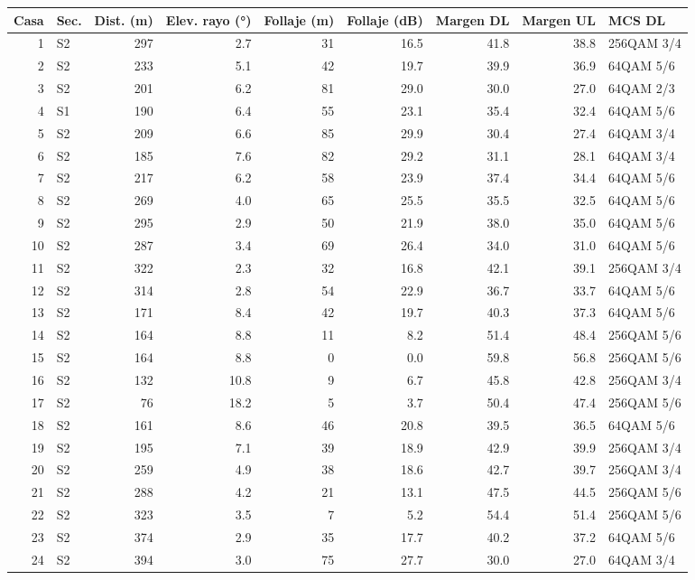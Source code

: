 \begin{longtable}{rlrrrrrrl}\toprule Casa & Sec. & Dist. (m) & Elev. rayo (°) & Follaje (m) & Follaje (dB) & Margen DL & Margen UL & MCS DL\\\midrule\endhead
1 & S2 & 297 & 2.7 & 31 & 16.5 & 41.8 & 38.8 & 256QAM 3/4\\
2 & S2 & 233 & 5.1 & 42 & 19.7 & 39.9 & 36.9 & 64QAM 5/6\\
3 & S2 & 201 & 6.2 & 81 & 29.0 & 30.0 & 27.0 & 64QAM 2/3\\
4 & S1 & 190 & 6.4 & 55 & 23.1 & 35.4 & 32.4 & 64QAM 5/6\\
5 & S2 & 209 & 6.6 & 85 & 29.9 & 30.4 & 27.4 & 64QAM 3/4\\
6 & S2 & 185 & 7.6 & 82 & 29.2 & 31.1 & 28.1 & 64QAM 3/4\\
7 & S2 & 217 & 6.2 & 58 & 23.9 & 37.4 & 34.4 & 64QAM 5/6\\
8 & S2 & 269 & 4.0 & 65 & 25.5 & 35.5 & 32.5 & 64QAM 5/6\\
9 & S2 & 295 & 2.9 & 50 & 21.9 & 38.0 & 35.0 & 64QAM 5/6\\
10 & S2 & 287 & 3.4 & 69 & 26.4 & 34.0 & 31.0 & 64QAM 5/6\\
11 & S2 & 322 & 2.3 & 32 & 16.8 & 42.1 & 39.1 & 256QAM 3/4\\
12 & S2 & 314 & 2.8 & 54 & 22.9 & 36.7 & 33.7 & 64QAM 5/6\\
13 & S2 & 171 & 8.4 & 42 & 19.7 & 40.3 & 37.3 & 64QAM 5/6\\
14 & S2 & 164 & 8.8 & 11 & 8.2 & 51.4 & 48.4 & 256QAM 5/6\\
15 & S2 & 164 & 8.8 & 0 & 0.0 & 59.8 & 56.8 & 256QAM 5/6\\
16 & S2 & 132 & 10.8 & 9 & 6.7 & 45.8 & 42.8 & 256QAM 3/4\\
17 & S2 & 76 & 18.2 & 5 & 3.7 & 50.4 & 47.4 & 256QAM 5/6\\
18 & S2 & 161 & 8.6 & 46 & 20.8 & 39.5 & 36.5 & 64QAM 5/6\\
19 & S2 & 195 & 7.1 & 39 & 18.9 & 42.9 & 39.9 & 256QAM 3/4\\
20 & S2 & 259 & 4.9 & 38 & 18.6 & 42.7 & 39.7 & 256QAM 3/4\\
21 & S2 & 288 & 4.2 & 21 & 13.1 & 47.5 & 44.5 & 256QAM 5/6\\
22 & S2 & 323 & 3.5 & 7 & 5.2 & 54.4 & 51.4 & 256QAM 5/6\\
23 & S2 & 374 & 2.9 & 35 & 17.7 & 40.2 & 37.2 & 64QAM 5/6\\
24 & S2 & 394 & 3.0 & 75 & 27.7 & 30.0 & 27.0 & 64QAM 3/4\\

\end{longtable}
